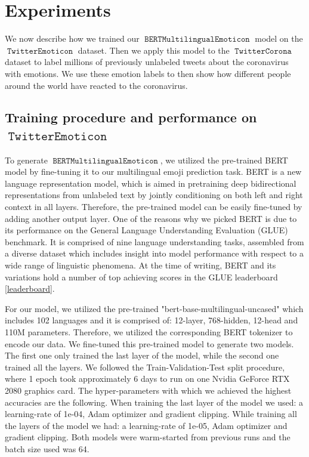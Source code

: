 \documentclass[11pt]{article}
\DeclareMathOperator{\model}{\texttt{BERTMultilingualEmoticon}}
\DeclareMathOperator{\emoticon}{\texttt{TwitterEmoticon}}
\DeclareMathOperator{\corona}{\texttt{TwitterCorona}}
\begin{document}
\section{Experiments}
\label{sec:experiments}

We now describe how we trained our $\model$ model on the $\emoticon$ dataset.
Then we apply this model to the $\corona$ dataset to label millions of previously unlabeled tweets about the coronavirus with emotions.
We use these emotion labels to then show how different people around the world have reacted to the coronavirus.

\subsection{Training procedure and performance on $\emoticon$}
To generate $\model$, we utilized the pre-trained BERT model \cite{bert} by fine-tuning it to our multilingual emoji prediction task. 
BERT is a new language representation model, which is aimed in pretraining deep bidirectional representations from unlabeled text by jointly conditioning on both left and right context in all layers.
Therefore, the pre-trained model can be easily fine-tuned by adding another output layer.
One of the reasons why we picked BERT is due to its performance on the General Language Understanding Evaluation (GLUE) \cite{} benchmark.
It is comprised of nine language understanding tasks, assembled from a diverse dataset which includes insight into model performance with respect to a wide range of linguistic phenomena.
At the time of writing, BERT and its variations hold a number of top achieving scores in the GLUE leaderboard \ref{leaderboard}.   

For our model, we utilized the pre-trained "bert-base-multilingual-uncased" which includes 102 languages and it is comprised of: 12-layer, 768-hidden, 12-head and 110M parameters.
Therefore, we utilized the corresponding BERT tokenizer to encode our data.
We fine-tuned this pre-trained model to generate two models. 
The first one only trained the last layer of the model, while the second one trained all the layers.
We followed the Train-Validation-Test split procedure, where 1 epoch took approximately 6 days to run on one Nvidia GeForce RTX 2080 graphics card.
The hyper-parameters with which we achieved the highest accuracies are the following. 
When training the last layer of the model we used: a learning-rate of 1e-04, Adam optimizer and gradient clipping. 
While training all the layers of the model we had: a learning-rate of 1e-05, Adam optimizer and gradient clipping. 
Both models were warm-started from previous runs and the batch size used was 64.
\end{document}
